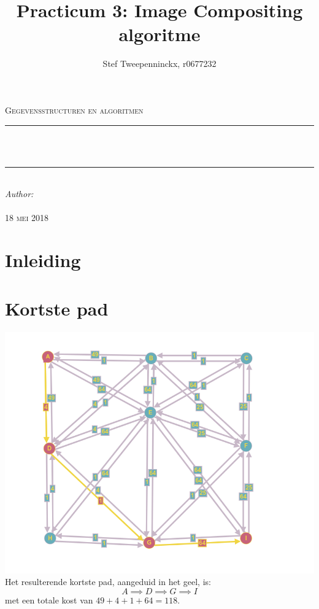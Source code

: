 \documentclass[11pt, a4paper]{article}
\author{Stef Tweepenninckx, r0677232}
\title{Practicum 3: Image Compositing algoritme}
\makeatletter
\def\printtitle{                 
    {\large \@title}}
\def\printauthor{                  
    {\large \@author}}
\makeatother
\begin{document}
\begin{titlepage}
\newcommand{\HRule}{\rule{\linewidth}{0.5mm}} 
\center 
\textsc{\LARGE Gegevensstructuren en algoritmen}\\[1.5cm] 
\HRule \\[0.4cm]

{\huge \bfseries \printtitle}\\[0.4cm] 
\HRule \\[0.4cm]

\Large \emph{Author:}\\
 \textsc{\printauthor}\\[3cm]

{\large \textsc{18 mei 2018}}\\[3cm] 

\vfill 
\end{titlepage}

\section*{Inleiding}

\newpage
\section*{Kortste pad}
\includegraphics[width=\textwidth]{grafe}
\vspace*{10px}
Het resulterende kortste pad, aangeduid in het geel, is: $$A \implies D \implies G \implies I$$ met een totale kost van $49 + 4 + 1 + 64 = 118$.
\end{document}
